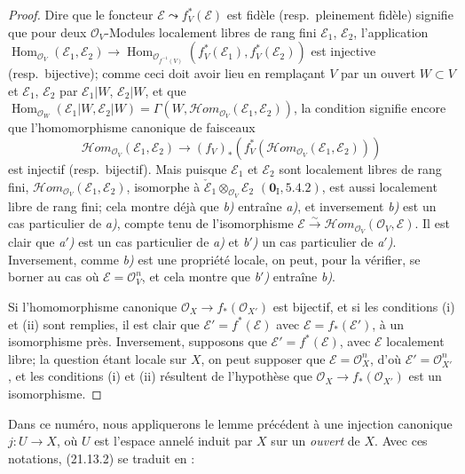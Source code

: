 \begin{proof}
Dire que le foncteur $\mathscr E\leadsto f_V^*(\mathscr E)$ est fidèle
(resp.\ pleinement fidèle) signifie que pour deux $\mathcal O_V$-Modules localement
libres de rang fini $\mathscr E_1$, $\mathscr E_2$, l'application
$\operatorname{Hom}_{\mathcal O_V}(\mathscr E_1,\mathscr E_2)
\longrightarrow
\operatorname{Hom}_{\mathcal O_{f^{-1}(V)}}
(f_V^*(\mathscr E_1),f_V^*(\mathscr E_2))$
est injective (resp.\ bijective); comme ceci doit avoir lieu en remplaçant $V$ par un
ouvert $W\subset V$ et $\mathscr E_1$, $\mathscr E_2$ par $\mathscr E_1|W$,
$\mathscr E_2|W$, et que
$\operatorname{Hom}_{\mathcal O_W}(\mathscr E_1|W,\mathscr E_2|W)
=\Gamma(W,\mathscr Hom_{\mathcal O_V}(\mathscr E_1,\mathscr E_2))$,
la condition signifie encore que l'homomorphisme canonique de faisceaux
\[
\label{IV.21.13.2.1}
  \mathscr Hom_{\mathcal O_V}(\mathscr E_1,\mathscr E_2)
  \longrightarrow
  (f_V)_*(f_V^*(\mathscr Hom_{\mathcal O_V}(\mathscr E_1,\mathscr E_2)))
  \tag{21.13.2.1}
\]
est injectif (resp.\ bijectif). Mais puisque $\mathscr E_1$ et $\mathscr E_2$ sont
localement libres de rang fini,
$\mathscr Hom_{\mathcal O_V}(\mathscr E_1,\mathscr E_2)$, isomorphe à
$\check{\mathscr E}_1\otimes_{\mathcal O_V}\mathscr E_2$
$(\mathbf 0_{\mathrm I}, 5.4.2)$, est aussi localement libre de rang fini; cela montre
déjà que \emph{b)} entraîne \emph{a)}, et inversement \emph{b)} est un cas particulier de \emph{a)},
compte tenu de l'isomorphisme
$\mathscr E\xrightarrow{\sim}\mathscr Hom_{\mathcal O_V}(\mathcal O_V,\mathscr E)$.
Il est clair que \emph{a$'$)} est un cas particulier de \emph{a)} et \emph{b$'$)} un cas particulier de
\emph{a$'$)}. Inversement, comme \emph{b)} est une propriété locale, on peut, pour la vérifier,
se borner au cas où $\mathscr E=\mathcal O_V^n$, et cela montre que \emph{b$'$)} entraîne
\emph{b)}.

Si l'homomorphisme canonique $\mathcal O_X\to f_*(\mathcal O_{X'})$ est bijectif,
et si les conditions (i) et (ii) sont remplies, il est clair que
$\mathscr E'=f^*(\mathscr E)$ avec $\mathscr E=f_*(\mathscr E')$, à un isomorphisme
près.
Inversement, supposons que $\mathscr E'=f^*(\mathscr E)$, avec $\mathscr E$ localement
libre; la question étant locale sur $X$, on peut supposer que
$\mathscr E=\mathcal O_X^n$, d'où $\mathscr E'=\mathcal O_{X'}^n$, et les conditions
(i) et (ii) résultent de l'hypothèse que
$\mathcal O_X\to f_*(\mathcal O_{X'})$ est un isomorphisme.
\end{proof}

Dans ce numéro, nous appliquerons le lemme précédent à une injection canonique
$j:U\to X$, où $U$ est l'espace annelé induit par $X$ sur un \emph{ouvert} de $X$.
Avec ces notations, (21.13.2) se traduit en :

